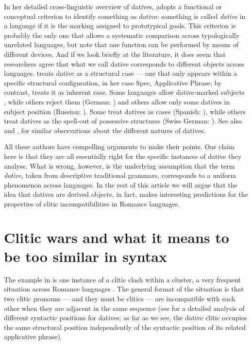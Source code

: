 \documentclass[output=paper,modfonts,nonflat,newtxmath,colorlinks,citecolor=brown]{langsci/langscibook}
\begin{document}
In her detailed cross-linguistic overview of datives, \citet{Næss2009} adopts a functional or conceptual criterion to identify something as dative: something is called \textit{dative} in a language if it is the marking assigned to prototypical goals. This criterion is probably the only one that allows a systematic comparison across typologically unrelated languages, but note that one function can be performed by means of different devices. And if we look briefly at the literature, it does seem that researchers agree that what we call dative corresponds to different objects across languages. \citet{Cuervo2003} treats dative as a structural case — one that only appears within a specific structural configuration, in her case Spec, Applicative Phrase; by contrast, \citet{Woolford2006} treats it as inherent case. Some languages allow dative-marked subjects \citep{ZaenenMalingThráinsson1985}, while others reject them (German: \citealt{Bayer2004}) and others allow only some datives in subject position (Russian: \citealt{MoorePerlmutter2000}). Some treat datives as cases (Spanish: \citealt{OrmazabalRomero2013Probus}), while others treat datives as the spell-out of possessive structures (Swiss German: \citealt{Leu2015}). See also  and , for similar observations about the different natures of datives.

All these authors have compelling arguments to make their points. Our claim here is that they are all essentially right for the specific instances of dative they analyse. What is wrong, however, is the underlying assumption that the term \textit{dative}, taken from descriptive traditional grammars, corresponds to a uniform phenomenon across languages. In the rest of this article we will argue that the idea that datives are derived objects, in fact, makes interesting predictions for the properties of clitic incompatibilities in Romance languages.

\section{Clitic wars and what it means to be too similar in syntax} %
\label{sec:cabre:2}

The example in  is one instance of a clitic clash within a cluster, a very frequent situation across Romance languages \citep{Rezac2010}. The general format of the situation is that two clitic pronouns — and they must be clitics — are incompatible with each other when they are adjacent in the same sequence (see  for a detailed analysis of different syntactic positions for datives; as far as we see, the dative clitic occupies the same structural position independently of the syntactic position of its related applicative phrase).
\end{document}
